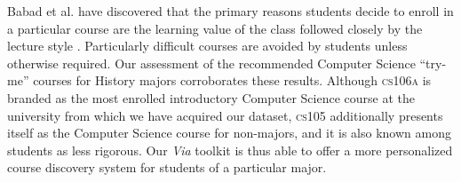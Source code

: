  Babad et al. have discovered that the primary reasons students decide
 to enroll in a particular course are the learning value of the class
 followed closely by the lecture style \cite{Babad2003}. Particularly
 difficult courses are avoided by students unless otherwise
 required. Our assessment of the recommended Computer Science
 ``try-me'' courses for History majors corroborates these
 results. Although \textsc{cs106a} is branded as the most enrolled
 introductory Computer Science course at the university from which we
 have acquired our dataset, \textsc{cs105} additionally presents
 itself as the Computer Science course for non-majors, and it is also
 known among students as less rigorous. Our \textit{Via} toolkit is
 thus able to offer a more personalized course discovery system for
 students of a particular major.
 
